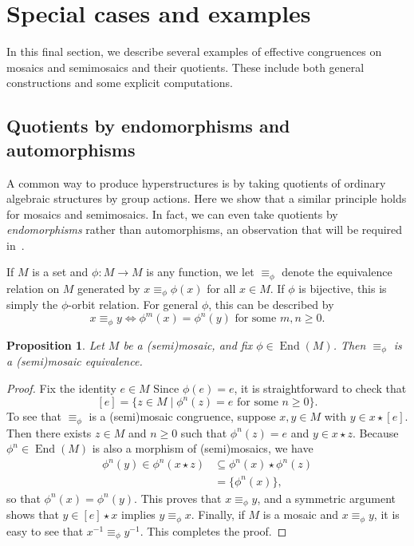\documentclass[reqno]{amsart}
\DeclareMathOperator{\End}{End}
\numberwithin{equation}{section}
\theoremstyle{plain}
\newtheorem{proposition}[equation]{Proposition}
\theoremstyle{definition}
\begin{document}
\section{Special cases and examples}
\label{sec:examples}

In this final section, we describe several examples of effective congruences on mosaics and semimosaics and their quotients. These include both general constructions and some explicit computations.


\subsection{Quotients by endomorphisms and automorphisms}

A common way to produce hyperstructures is by taking quotients of ordinary algebraic structures by group actions. Here we show that a similar principle holds for mosaics and semimosaics. In fact, we can even take quotients by \emph{endomorphisms} rather than automorphisms, an observation that will be required in~\cite{NakamuraReyes:Hoops}.


If $M$ is a set and $\phi \colon M \to M$ is any function, we let ${\equiv_\phi}$ denote the equivalence relation on $M$ generated by $x \equiv_\phi \phi(x)$ for all $x \in M$. If $\phi$ is bijective, this is simply the $\phi$-orbit relation. For general $\phi$, this can be described by
\[
x \equiv_\phi y \iff \phi^m(x) = \phi^n(y) \mbox{ for some } m,n \geq 0.
\]

\begin{proposition}\label{prop:orbit equivalence}
Let $M$ be a (semi)mosaic, and fix $\phi \in \End(M)$. Then $\equiv_\phi$ is a (semi)mosaic equivalence.
\end{proposition}

\begin{proof}
Fix the identity $e \in M$
Since $\phi(e) = e$, it is straightforward to check that
\[
[e] = \{z \in M \mid \phi^n(z) = e \mbox{ for some } n \geq 0\}.
\]
To see that $\equiv_\phi$ is a (semi)mosaic congruence, suppose $x,y \in M$ with $y \in x \star [e]$. Then there exists $z \in M$ and $n \geq 0$ such that $\phi^n(z) = e$ and $y \in x \star z$. Because $\phi^n \in \End(M)$ is also a morphism of (semi)mosaics, we have
\begin{align*}
\phi^n(y) \in \phi^n(x \star z) &\subseteq \phi^n(x) \star \phi^n(z) \\
&= \{\phi^n(x)\},
\end{align*}
so that $\phi^n(x) = \phi^n(y)$. This proves that $x \equiv_\phi y$, and a symmetric argument shows that $y \in [e] \star x$ implies $y \equiv_\phi x$. Finally, if $M$ is a mosaic and $x \equiv_\phi y$, it is easy to see that $x^{-1} \equiv_\phi y^{-1}$. This completes the proof.
\end{proof}
\end{document}
